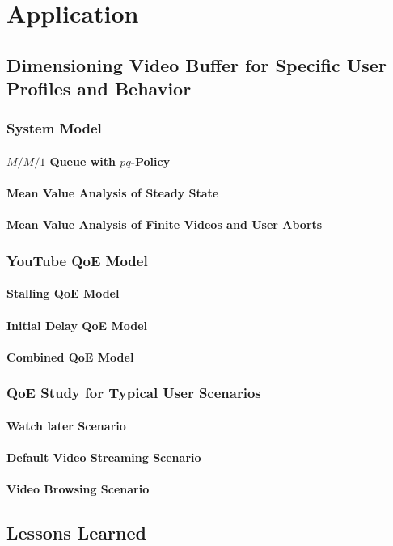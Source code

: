 \chapter{Application}\label{chap:application}




\section{Dimensioning Video Buffer for Specific User Profiles and Behavior}
\cite{Hossfeld2015}

\subsection{System Model}
\subsubsection*{\(M/M/1\) Queue with \(pq\)-Policy}
\subsubsection*{Mean Value Analysis of Steady State}
\subsubsection*{Mean Value Analysis of Finite Videos and User Aborts}

\subsection{YouTube QoE Model}
\subsubsection*{Stalling QoE Model}
\subsubsection*{Initial Delay QoE Model}
\subsubsection*{Combined QoE Model}

\subsection{QoE Study for Typical User Scenarios}
\subsubsection*{Watch later Scenario}
\subsubsection*{Default Video Streaming Scenario}
\subsubsection*{Video Browsing Scenario}



\section{Lessons Learned}
